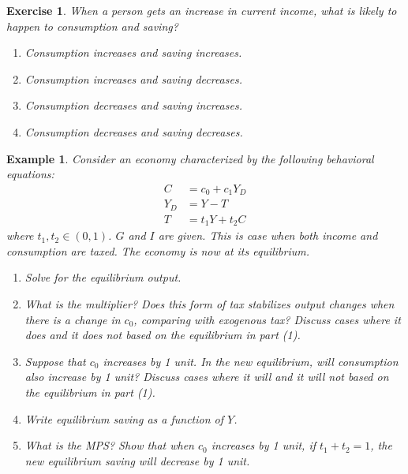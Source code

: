 \documentclass[12pt]{article}
\newtheorem{example}{Example}
\newtheorem{exercise}{Exercise}
\begin{document}
\begin{exercise}
    When a person gets an increase in current income, what is likely to happen to consumption and saving?
    \begin{enumerate}[label=\Alph*.]
        \item Consumption increases and saving increases.
        \item Consumption increases and saving decreases.
        \item Consumption decreases and saving increases.
        \item Consumption decreases and saving decreases.
    \end{enumerate}
\end{exercise}

\begin{example}
    Consider an economy characterized by the following behavioral equations:
    \begin{align*}
        C &= c_0 + c_1 Y_D\\
        Y_D &= Y - T\\
        T &= t_1 Y + t_2 C
    \end{align*}
    where $t_1, t_2 \in (0,1)$. $G$ and $I$ are given. This is case when both income and consumption are taxed. The economy is now at its equilibrium.
    \begin{enumerate}[label=(\arabic*)]
        \item Solve for the equilibrium output.
        \item What is the multiplier? Does this form of tax stabilizes output changes when there is a change in $c_0$, comparing with exogenous tax? Discuss cases where it does and it does not based on the equilibrium in part (1).
        \item Suppose that $c_0$ increases by 1 unit. In the new equilibrium, will consumption also increase by 1 unit? Discuss cases where it will and it will not based on the equilibrium in part (1).
        \item Write equilibrium saving as a function of $Y$.
        \item What is the MPS? Show that when $c_0$ increases by 1 unit, if $t_1+t_2=1$, the new equilibrium saving will decrease by 1 unit.
    \end{enumerate} 
\end{example}
\end{document}

